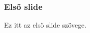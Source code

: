 \documentclass{beamer}
\begin{document}
\begin{frame}
\frametitle{Első slide}
Ez itt az első slide szövege.
\end{frame}
\end{document}
